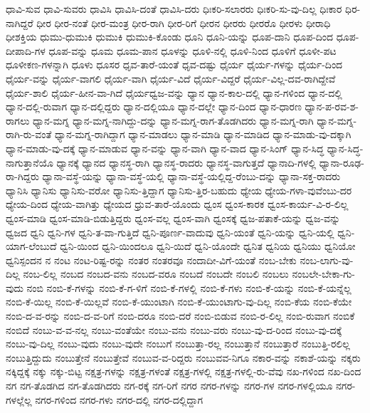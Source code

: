 {ಧಾವಿ-ಸುವ
ಧಾವಿ-ಸುವರು
ಧಾವಿಸಿ
ಧಾವಿಸಿ-ದಂತೆ
ಧಾವಿಸಿ-ದರು
ಧಿಃಕರಿ-ಸಲಾರರು
ಧಿಃಕರಿ-ಸು-ವು-ದಿಲ್ಲ
ಧಿಃಕಾರ
ಧಿರ-ನಾಗಿದ್ದರೆ
ಧೀರ
ಧೀರ-ನಂತೆ
ಧೀರ-ಮಂತ್ರ
ಧೀರ-ರಾಗಿ
ಧೀರ-ರಿಗೆ
ಧೀರನ
ಧೀರರು
ಧೀರರೊ
ಧೀರಳು
ಧೀರಾಧಿ
ಧೀಶಕ್ತಿಯ
ಧುಮು-ಧುಮುಕಿ
ಧುಮುಕಿ
ಧುಮುಕಿ-ಕೊಂಡು
ಧೂನಿ
ಧೂನಿ-ಯನ್ನು
ಧೂಪ-ದಾನಿ
ಧೂಪ-ದಿಂದ
ಧೂಪ-ದೀಪಾದಿ-ಗಳ
ಧೂಪ-ವನ್ನು
ಧೂಮ
ಧೂಮ-ಪಾನ
ಧೂಳನ್ನು
ಧೂಳಿ-ನಲ್ಲಿ
ಧೂಳಿ-ನಿಂದ
ಧೂಳಿಗೆ
ಧೂಳೀ-ಪಟ
ಧೂಳೀಕಣ-ಗಳನ್ನಾಗಿ
ಧೂಳು
ಧೂಸರ
ಧೃವ-ತಾರೆ-ಯಂತೆ
ಧೃವ-ದಷ್ಟು
ಧೈರ್ಯ
ಧೈರ್ಯ-ಗಳನ್ನು
ಧೈರ್ಯ-ದಿಂದ
ಧೈರ್ಯ-ವನ್ನು
ಧೈರ್ಯ-ವಾಗಲಿ
ಧೈರ್ಯ-ವಾಗಿ
ಧೈರ್ಯ-ವಿದೆ
ಧೈರ್ಯ-ವಿದ್ದರೆ
ಧೈರ್ಯ-ವಿಲ್ಲ-ದವ-ರಾಗಿದ್ದೇವೆ
ಧೈರ್ಯ-ಶಾಲಿ
ಧೈರ್ಯ-ಹೀನ-ವಾ-ಗಿದೆ
ಧೈರ್ಯಧ್ವಜ-ವನ್ನು
ಧ್ಯಾನ
ಧ್ಯಾನ-ಕಾಲ-ದಲ್ಲಿ
ಧ್ಯಾನ-ಗಳಿಂದ
ಧ್ಯಾನ-ದಲ್ಲಿ
ಧ್ಯಾನ-ದಲ್ಲಿ-ರುವಾಗ
ಧ್ಯಾನ-ದಲ್ಲಿದ್ದರು
ಧ್ಯಾನ-ದಲ್ಲಿಯೂ
ಧ್ಯಾನ-ದಲ್ಲೇ
ಧ್ಯಾನ-ದಿಂದ
ಧ್ಯಾನ-ಧಾರಣ
ಧ್ಯಾನ-ಪ-ರವ-ಶ-ರಾಗಲು
ಧ್ಯಾನ-ಮಗ್ನ
ಧ್ಯಾನ-ಮಗ್ನ-ನಾಗಿದ್ದು-ದನ್ನು
ಧ್ಯಾನ-ಮಗ್ನ-ರಾಗ-ತೊಡಗಿದರು
ಧ್ಯಾನ-ಮಗ್ನ-ರಾಗಿ
ಧ್ಯಾನ-ಮಗ್ನ-ರಾಗಿ-ರು-ವಂತೆ
ಧ್ಯಾನ-ಮಗ್ನ-ರಾಗಿದ್ದಾಗ
ಧ್ಯಾನ-ಮಾಡಲು
ಧ್ಯಾನ-ಮಾಡಿ
ಧ್ಯಾನ-ಮಾಡಿದ
ಧ್ಯಾನ-ಮಾಡು-ವು-ದಕ್ಕಾಗಿ
ಧ್ಯಾನ-ಮಾಡು-ವು-ದಕ್ಕೆ
ಧ್ಯಾನ-ಮಾಡುವ
ಧ್ಯಾನ-ವನ್ನು
ಧ್ಯಾನ-ವಾಗಿ
ಧ್ಯಾನ-ವಾದ
ಧ್ಯಾನ-ಸಿಂಗ್
ಧ್ಯಾನ-ಸಿದ್ಧ
ಧ್ಯಾನ-ಸಿದ್ಧ-ನಾಗುತ್ತಾನೆಯೊ
ಧ್ಯಾನಕ್ಕೆ
ಧ್ಯಾನದ
ಧ್ಯಾನಸ್ಥ-ರಾಗಿ
ಧ್ಯಾನಸ್ಥ-ರಾದರು
ಧ್ಯಾನಸ್ಥ-ವಾಗುತ್ತದೆ
ಧ್ಯಾನಾದಿ-ಗಳಲ್ಲಿ
ಧ್ಯಾನಾ-ರೂಢ-ರಾ-ಗಿದ್ದರು
ಧ್ಯಾನಾ-ವಸ್ಥೆ-ಯನ್ನು
ಧ್ಯಾನಾ-ವಸ್ಥೆ-ಯಲ್ಲಿ
ಧ್ಯಾನಾ-ವಸ್ಥೆ-ಯಲ್ಲಿದ್ದ-ರೆಂಬು-ದನ್ನು
ಧ್ಯಾನಾ-ಸಕ್ತ-ರಾದರು
ಧ್ಯಾನಿಸಿ
ಧ್ಯಾನಿಸು
ಧ್ಯಾನಿಸು-ವರೋ
ಧ್ಯಾನಿಸು-ತ್ತಿದ್ದಾಗ
ಧ್ಯಾನಿಸು-ತ್ತಿರ-ಬಹುದು
ಧ್ಯೇಯ
ಧ್ಯೇಯ-ಗಳಾ-ವುವೆಂಬು-ದರ
ಧ್ಯೇಯ-ದಿಂದ
ಧ್ಯೇಯ-ವಾಗಿತ್ತು
ಧ್ಯೇಯದ
ಧ್ರುವ-ತಾರೆ-ಯೊಂದು
ಧ್ವಂಸ
ಧ್ವಂಸ-ಕಾರಕ
ಧ್ವಂಸ-ಕಾರ್ಯ-ವಿ-ರ-ಲಿಲ್ಲ
ಧ್ವಂಸ-ಮಾಡಿ
ಧ್ವಂಸ-ಮಾಡಿ-ಬಿಡುತ್ತಿದ್ದರು
ಧ್ವಂಸ-ವಲ್ಲ
ಧ್ವಂಸ-ವಾಗಿ
ಧ್ವಂಸಕ್ಕೆ
ಧ್ವಜ-ಪತಾಕೆ-ಯನ್ನು
ಧ್ವಜ-ವನ್ನು
ಧ್ವಜದ
ಧ್ವನಿ
ಧ್ವನಿ-ಗಳ
ಧ್ವನಿ-ತ-ವಾ-ಗುತ್ತಿದೆ
ಧ್ವನಿ-ಪೂರ್ಣ-ವಾದುವು
ಧ್ವನಿ-ಯಂತೆ
ಧ್ವನಿ-ಯನ್ನು
ಧ್ವನಿ-ಯಲ್ಲಿ
ಧ್ವನಿ-ಯಾಗ-ಲೆಂಬುದೆ
ಧ್ವನಿ-ಯಿಂದ
ಧ್ವನಿ-ಯಿಂದಲೂ
ಧ್ವನಿ-ಯಿದೆ
ಧ್ವನಿ-ಯೊಂದೇ
ಧ್ವನಿತ
ಧ್ವನಿಯ
ಧ್ವನಿಯು
ಧ್ವನಿಯೋ
ಧ್ವನಿಸ್ಪಂದನ
ನ
ನಂಟ
ನಂಟ-ರಿಷ್ಟ-ರನ್ನು
ನಂತರ
ನಂತರವೂ
ನಂದಾದೀ-ವಿಗೆ-ಯಂತೆ
ನಂಬ-ಬೇಕು
ನಂಬ-ಲಾಗು-ವು-ದಿಲ್ಲ
ನಂಬ-ಲಿಲ್ಲ
ನಂಬದ
ನಂಬದ-ವನು
ನಂಬದ-ವರೂ
ನಂಬದೆ
ನಂಬದೇ
ನಂಬಲಿ
ನಂಬಲು
ನಂಬಲೇ-ಬೇಕಾ-ಗು-ವುದು
ನಂಬಿ
ನಂಬಿ-ಕೆ-ಗಳನ್ನು
ನಂಬಿ-ಕೆ-ಗ-ಳಿಗೆ
ನಂಬಿ-ಕೆ-ಗಳಲ್ಲಿ
ನಂಬಿ-ಕೆ-ಗಳು
ನಂಬಿ-ಕೆ-ಯನ್ನು
ನಂಬಿ-ಕೆ-ಯನ್ನೆಲ್ಲ
ನಂಬಿ-ಕೆ-ಯಿಲ್ಲ
ನಂಬಿ-ಕೆ-ಯಿಲ್ಲವೆ
ನಂಬಿ-ಕೆ-ಯುಂಟಾಗಿ
ನಂಬಿ-ಕೆ-ಯುಂಟಾಗು-ವು-ದಿಲ್ಲ
ನಂಬಿ-ಕೆಯ
ನಂಬಿ-ಕೆಯೇ
ನಂಬಿ-ದ-ವ-ರನ್ನು
ನಂಬಿ-ದ-ವ-ರಿಗೆ
ನಂಬಿ-ದರೂ
ನಂಬಿ-ದರೆ
ನಂಬಿ-ಬಿಡುವ
ನಂಬಿ-ರ-ಲಿಲ್ಲ
ನಂಬಿ-ರುವಾಗ
ನಂಬಿಕೆ
ನಂಬಿದೆ
ನಂಬು-ವ-ವ-ನಲ್ಲ
ನಂಬು-ವಂತೆಯೇ
ನಂಬು-ವನು
ನಂಬು-ವರು
ನಂಬು-ವು-ದ-ರಿಂದ
ನಂಬು-ವು-ದಕ್ಕೆ
ನಂಬು-ವು-ದಿಲ್ಲ
ನಂಬು-ವುದು
ನಂಬು-ವುದೇ
ನಂಬುಗೆ
ನಂಬುತ್ತಾ-ರಲ್ಲ
ನಂಬುತ್ತಾನೆ
ನಂಬುತ್ತಾರೆ
ನಂಬುತ್ತಿ-ರಲಿಲ್ಲ
ನಂಬುತ್ತಿದ್ದುದು
ನಂಬುತ್ತೇನೆ
ನಂಬುತ್ತೇವೆ
ನಂಬುವ-ವ-ರಿದ್ದರು
ನಂಬುವವ-ನಿಗೂ
ನಕಾರ-ವನ್ನು
ನಕಾಶೆ-ಯನ್ನು
ನಕ್ಕರು
ನಕ್ಕಿದ್ದಕ್ಕೆ
ನಕ್ಕು
ನಕ್ಕು-ಬಿಟ್ಟ
ನಕ್ಷತ್ರ-ಗಳನ್ನು
ನಕ್ಷತ್ರ-ಗಳಂತೆ
ನಕ್ಷತ್ರ-ಗಳಲ್ಲಿ
ನಕ್ಷತ್ರ-ಗಳಲ್ಲಿ-ರು-ವೆವು
ನಖ-ಗಳಿಂದ
ನಖ-ದಿಂದ
ನಗ
ನಗ-ತೊಡಗಿದ
ನಗ-ತೊಡಗಿದರು
ನಗ-ರಕ್ಕೆ
ನಗ-ರಿಗೆ
ನಗರ
ನಗರ-ಗಳನ್ನು
ನಗರ-ಗಳ
ನಗರ-ಗಳಲ್ಲಿಯೂ
ನಗರ-ಗಳಲ್ಲೆಲ್ಲ
ನಗರ-ಗಳಿಂದ
ನಗರ-ಗಳು
ನಗರ-ದಲ್ಲಿ
ನಗರ-ದಲ್ಲಿದ್ದಾಗ
}
